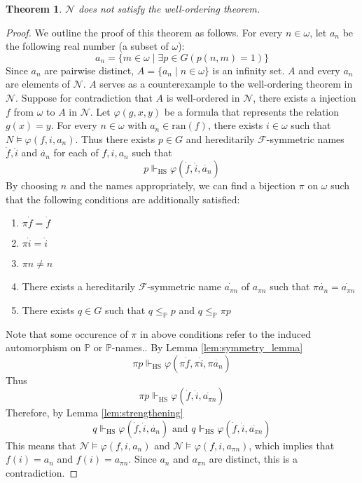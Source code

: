 \documentclass{report}
\newtheorem{thm}{Theorem}[chapter]
\newcommand{\Pbb}{\mathbb{P}}
\newcommand{\Fcal}{\mathcal{F}}
\newcommand{\Ncal}{\mathcal{N}}
\begin{document}
\begin{thm}
  $\Ncal$ does not satisfy the well-ordering theorem.
\end{thm}

\begin{proof}
We outline the proof of this theorem as follows. 
For every $n \in \omega$, let $a_n$ be the following real number (a subset of $\omega$):
$$a_n = \{ m \in \omega \mid \exists p \in G (p(n, m) = 1) \}$$
Since $a_n$ are pairwise distinct, $A = \{ a_n \mid n \in \omega \}$ is an infinity set.
$A$ and every $a_n$ are elements of $\Ncal$.
$A$ serves as a counterexample to the well-ordering theorem in $\Ncal$.
Suppose for contradiction that $A$ is well-ordered in $\Ncal$, there exists a injection $f$ from $\omega$ to $A$ in $\Ncal$.
Let $\varphi(g,x,y)$ be a formula that represents the relation $g(x) = y$. 
For every $n \in \omega$ with $a_n \in \text{ran}(f)$, there exists $i \in \omega$ such that $N \vDash \varphi(f, i, a_n)$.
Thus there exists $p \in G$ and hereditarily $\Fcal$-symmetric names $\dot{f}, \dot{i}$ and $\dot{a_n}$ for each of $f, i, a_n$ such that 
$$p \Vdash_{\text{HS}} \varphi(\dot{f}, \dot{i}, \dot{a_n})$$
By choosing $n$ and the names appropriately, we can find a bijection $\pi$ on $\omega$ such that the following conditions are additionally satisfied:
\begin{enumerate}
  \item $\pi \dot{f} = \dot{f}$
  \item $\pi \dot{i} = \dot{i}$
  \item $\pi n \ne n$
  \item There exists a hereditarily $\Fcal$-symmetric name $\dot{a_{\pi n}}$ of $a_{\pi n}$ such that $\pi \dot{a_n} = \dot{a_{\pi n}}$
  \item There exists $q \in G$ such that $q \leq_{\Pbb} p$ and $q \leq_{\Pbb} \pi p$
\end{enumerate}
Note that some occurence of $\pi$ in above conditions refer to the induced automorphism on $\Pbb$ or $\Pbb$-names..
By Lemma \ref{lem:symmetry_lemma}
$$\pi p \Vdash_{\text{HS}} \varphi(\pi \dot{f}, \pi \dot{i}, \pi \dot{a_n})$$
Thus 
$$\pi p \Vdash_{\text{HS}} \varphi(\dot{f}, \dot{i}, \dot{a_{\pi n}})$$
Therefore, by Lemma \ref{lem:strengthening}
$$q \Vdash_{\text{HS}} \varphi(\dot{f}, \dot{i}, \dot{a_n}) \text{ and } q \Vdash_{\text{HS}} \varphi(\dot{f}, \dot{i}, \dot{a_{\pi n}})$$
This means that $\Ncal \vDash \varphi(f, i, a_n)$ and $\Ncal \vDash \varphi(f, i, a_{\pi n})$, which implies that $f(i) = a_n$ and $f(i) = a_{\pi n}$.
Since $a_n$ and $a_{\pi n}$ are distinct, this is a contradiction. 
\end{proof}
 
\end{document}
